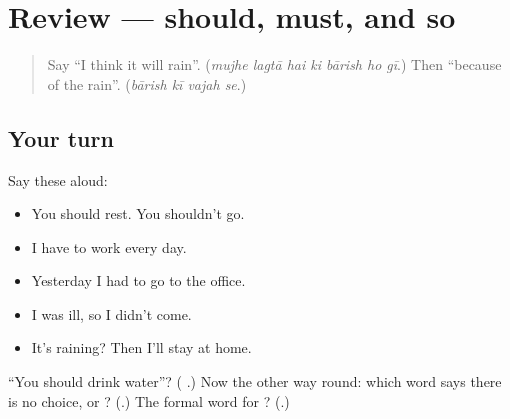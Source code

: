 \section[(review)]{Review — should, must, and so}

\label{lesson:UR-R269-advice-and-reasons}



\begin{quote}
Say \textquotedblleft{}I think it will rain\textquotedblright{}. (\emph{mujhe lagtā hai ki bārish ho gī}.) Then \textquotedblleft{}because of the rain\textquotedblright{}. (\emph{bārish kī vajah se}.)
\end{quote}

\subsection*{Your turn}
Say these aloud:

\begin{itemize}
\raggedright
  \item You should rest. You shouldn't go.
  \item I have to work every day.
  \item Yesterday I had to go to the office.
  \item I was ill, so I didn't come.
  \item It's raining? Then I'll stay at home.
\end{itemize}

\begin{tcolorbox}[breakable,colback=teal!4,colframe=teal!35!black,title={Before you move on}]
\textquotedblleft{}You should drink water\textquotedblright{}? (\textbf{    }.) Now the other way round: which word says there is no choice, \textbf{} or \textbf{}? (\textbf{}.) The formal word for \textbf{ }? (\textbf{}.)
\end{tcolorbox}
